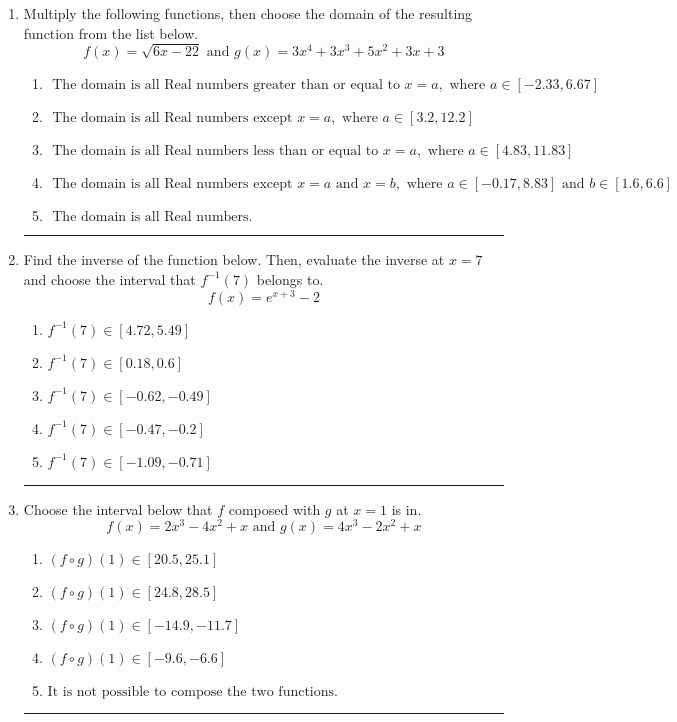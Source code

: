 \documentclass[14pt]{extbook}
\newcommand{\litem}[1]{\item#1\hspace*{-1cm}\rule{\textwidth}{0.4pt}}
\begin{document}
\begin{enumerate}
{\begin{enumerate}[label=\Alph*.]
\end{enumerate} }
\litem{
Multiply the following functions, then choose the domain of the resulting function from the list below.\[ f(x) = \sqrt{6x-22}  \text{ and } g(x) = 3x^{4} +3 x^{3} +5 x^{2} +3 x + 3 \]\begin{enumerate}[label=\Alph*.]
\item \( \text{ The domain is all Real numbers greater than or equal to } x = a, \text{ where } a \in [-2.33, 6.67] \)
\item \( \text{ The domain is all Real numbers except } x = a, \text{ where } a \in [3.2, 12.2] \)
\item \( \text{ The domain is all Real numbers less than or equal to } x = a, \text{ where } a \in [4.83, 11.83] \)
\item \( \text{ The domain is all Real numbers except } x = a \text{ and } x = b, \text{ where } a \in [-0.17, 8.83] \text{ and } b \in [1.6, 6.6] \)
\item \( \text{ The domain is all Real numbers. } \)

\end{enumerate} }
\litem{
Find the inverse of the function below. Then, evaluate the inverse at $x = 7$ and choose the interval that $f^{-1}(7)$ belongs to.\[ f(x) = e^{x+3}-2 \]\begin{enumerate}[label=\Alph*.]
\item \( f^{-1}(7) \in [4.72, 5.49] \)
\item \( f^{-1}(7) \in [0.18, 0.6] \)
\item \( f^{-1}(7) \in [-0.62, -0.49] \)
\item \( f^{-1}(7) \in [-0.47, -0.2] \)
\item \( f^{-1}(7) \in [-1.09, -0.71] \)

\end{enumerate} }
\litem{
Choose the interval below that $f$ composed with $g$ at $x=1$ is in.\[ f(x) = 2x^{3} -4 x^{2} +x \text{ and } g(x) = 4x^{3} -2 x^{2} +x \]\begin{enumerate}[label=\Alph*.]
\item \( (f \circ g)(1) \in [20.5, 25.1] \)
\item \( (f \circ g)(1) \in [24.8, 28.5] \)
\item \( (f \circ g)(1) \in [-14.9, -11.7] \)
\item \( (f \circ g)(1) \in [-9.6, -6.6] \)
\item \( \text{It is not possible to compose the two functions.} \)


\end{enumerate}}
\end{enumerate}
\end{document}
